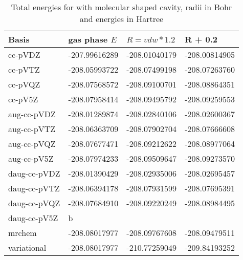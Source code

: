 \documentclass[../Thesis.tex]{subfiles}
\begin{document}
\begin{table}[htbp]
\caption{Total energies for  with molecular shaped cavity, radii in Bohr and energies in Hartree}
\begin{tabular}{l|r|r|r}
Basis & \multicolumn{1}{l|}{gas phase $E$} & \multicolumn{1}{l|}{$R = vdw*1.2$} & \multicolumn{1}{l|}{R + 0.2} \\ \hline
cc-pVDZ & -207.99616289 & -208.01040179 & -208.00814905 \\
cc-pVTZ & -208.05993722 & -208.07499198 & -208.07263760 \\
cc-pVQZ & -208.07568572 & -208.09100701 & -208.08864351 \\
cc-pV5Z & -208.07958414 & -208.09495792 & -208.09259553 \\ \hline
aug-cc-pVDZ & -208.01289874 & -208.02840106 & -208.02600367 \\
aug-cc-pVTZ & -208.06363709 & -208.07902704 & -208.07666608 \\
aug-cc-pVQZ & -208.07677471 & -208.09212622 & -208.08977064 \\
aug-cc-pV5Z & -208.07974233 & -208.09509647 & -208.09273570 \\ \hline
daug-cc-pVDZ & -208.01390429 & -208.02935006 & -208.02695457 \\
daug-cc-pVTZ & -208.06394178 & -208.07931599 & -208.07695391 \\
daug-cc-pVQZ & -208.07684910 & -208.09220249 & -208.08984495 \\
daug-cc-pV5Z & \multicolumn{1}{l|}{b} & \multicolumn{1}{l|}{} & \multicolumn{1}{l|}{} \\ \hline
mrchem & -208.08017977 & -208.09767608 & -208.09479511 \\
variational & -208.08017977 & -210.77259049 & -209.84193252 \\
\end{tabular}
\label{tab:acetamidrawdataabc}
\end{table}
\end{document}
